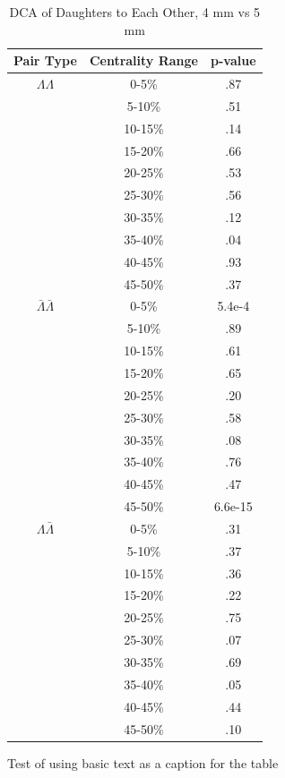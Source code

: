 \begin{table}
\caption {DCA of Daughters to Each Other, 4 mm vs 5 mm} \label{tab:DcaDaughtersEachOtherPvalueTests4mmVs5mm}
\begin{center}
\begin{tabular}{| c | c | c |}
  \hline                       
  Pair Type & Centrality Range & p-value \\
  \hline
  $\Lambda\Lambda$ & 0-5\% & .87 \\
   & 5-10\%  & .51 \\
   & 10-15\% & .14 \\
   & 15-20\% & .66 \\
   & 20-25\% & .53 \\
   & 25-30\% & .56 \\
   & 30-35\% & .12 \\
   & 35-40\% & .04 \\
   & 40-45\% & .93 \\
   & 45-50\% & .37 \\
   \hline
  $\bar{\Lambda}\bar{\Lambda}$ &  0-5\% & 5.4e-4 \\
   & 5-10\% & .89 \\
   & 10-15\% & .61 \\
   & 15-20\% & .65 \\
   & 20-25\% & .20 \\
   & 25-30\% & .58 \\
   & 30-35\% & .08 \\
   & 35-40\% & .76 \\
   & 40-45\% & .47 \\
   & 45-50\% & 6.6e-15 \\
   \hline
  $\Lambda\bar{\Lambda}$ &  0-5\% & .31 \\
   & 5-10\% & .37 \\
   & 10-15\% & .36 \\
   & 15-20\% & .22 \\
   & 20-25\% & .75 \\
   & 25-30\% & .07 \\
   & 30-35\% & .69 \\
   & 35-40\% & .05 \\
   & 40-45\% & .44 \\
   & 45-50\% & .10 \\
  \hline  
\end{tabular}
Test of using basic text as a caption for the table
\end{center}
\end{table}





